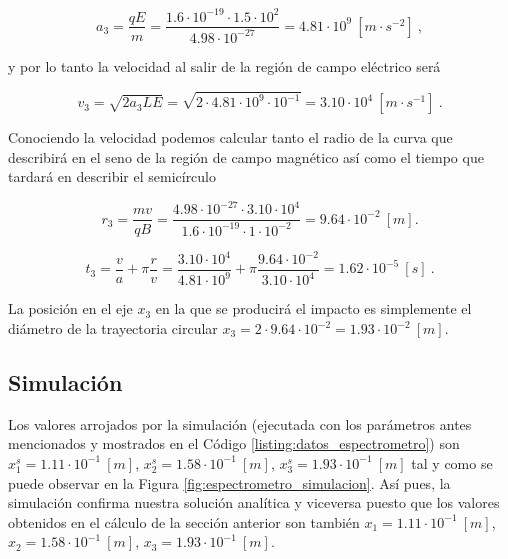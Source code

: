 \documentclass[journal]{IEEEtran}
\begin{document}
\begin{equation}
a_3 = \displaystyle\frac{qE}{m} = \displaystyle\frac{1.6\cdot 10^{-19}\cdot 1.5\cdot 10^{2}}{4.98\cdot 10^{-27}} = 4.81 \cdot 10^{9}~[m\cdot s^{-2}]~,
\end{equation}

y por lo tanto la velocidad al salir de la región de campo eléctrico será

\begin{equation}
v_3 = \sqrt{2a_3LE} = \sqrt{2\cdot 4.81 \cdot 10^{9} \cdot 10^{-1}} = 3.10 \cdot 10^4~[m\cdot s^{-1}]~.
\end{equation}

Conociendo la velocidad podemos calcular tanto el radio de la curva que describirá en el seno de la región de campo magnético así como el tiempo que tardará en describir el semicírculo

\begin{equation}
r_3 = \displaystyle\frac{mv}{qB} = \displaystyle\frac{4.98\cdot 10^{-27} \cdot 3.10\cdot 10^4}{1.6\cdot 10^{-19}\cdot 1 \cdot 10^{-2}} = 9.64\cdot 10^{-2}~[m].
\end{equation}

\begin{equation}
t_3 = \displaystyle\frac{v}{a} + \pi \displaystyle\frac{r}{v} = \displaystyle\frac{3.10 \cdot 10^4}{4.81 \cdot 10^{9}} + \pi \displaystyle\frac{9.64 \cdot 10^{-2}}{3.10 \cdot 10^4} = 1.62 \cdot 10^{-5}~[s]~.
\end{equation}

La posición en el eje $x_3$ en la que se producirá el impacto es simplemente el diámetro de la trayectoria circular $x_3 = 2\cdot9.64 \cdot 10^{-2} = 1.93 \cdot 10^{-2}~[m]$.

\subsection{Simulación}

Los valores arrojados por la simulación (ejecutada con los parámetros antes mencionados y mostrados en el Código \ref{listing:datos_espectrometro}) son $x^s_1 = 1.11\cdot 10^{-1}~[m]$, $x^s_2 = 1.58\cdot 10^{-1}~[m]$, $x^s_3 = 1.93\cdot 10^{-1}~[m]$ tal y como se puede observar en la Figura \ref{fig:espectrometro_simulacion}. Así pues, la simulación confirma nuestra solución analítica y viceversa puesto que los valores obtenidos en el cálculo de la sección anterior son también $x_1 = 1.11\cdot 10^{-1}~[m]$, $x_2 = 1.58\cdot 10^{-1}~[m]$, $x_3 = 1.93\cdot 10^{-1}~[m]$.
\end{document}
